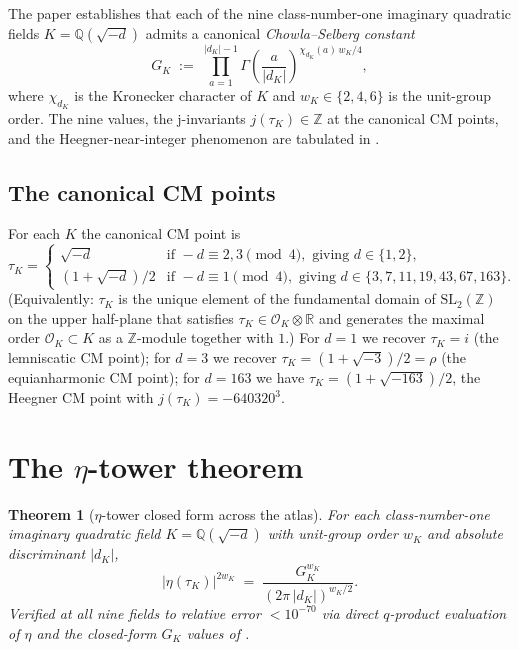 \documentclass[11pt]{amsart}
\theoremstyle{plain}
\newtheorem{theorem}{Theorem}[section]
\theoremstyle{definition}
\theoremstyle{remark}
\newcommand{\GK}{G_{K}}
\newcommand{\Z}{\mathbb{Z}}
\newcommand{\Q}{\mathbb{Q}}
\newcommand{\R}{\mathbb{R}}
\begin{document}
The paper \cite{paper-gstar-C} establishes that each of the nine
class-number-one imaginary quadratic fields $K = \Q(\sqrt{-d})$ admits a
canonical \emph{Chowla--Selberg constant}
\[
\GK \;:=\; \prod_{a=1}^{|d_K| - 1} \Gamma\!\left(\frac{a}{|d_K|}\right)^{\chi_{d_K}(a)\, w_K / 4},
\]
where $\chi_{d_K}$ is the Kronecker character of $K$ and $w_K \in \{2, 4, 6\}$
is the unit-group order. The nine values, the j-invariants $j(\tau_K) \in \Z$
at the canonical CM points, and the Heegner-near-integer phenomenon are
tabulated in \cite[Theorem 1.3]{paper-gstar-C}.

\subsection{The canonical CM points}

For each $K$ the canonical CM point is
\[
\tau_K =
\begin{cases}
\sqrt{-d} & \text{if } -d \equiv 2, 3 \pmod 4, \text{ giving } d \in \{1, 2\}, \\
(1 + \sqrt{-d})/2 & \text{if } -d \equiv 1 \pmod 4, \text{ giving } d \in \{3, 7, 11, 19, 43, 67, 163\}.
\end{cases}
\]
(Equivalently: $\tau_K$ is the unique element of the fundamental domain of
$\mathrm{SL}_{2}(\Z)$ on the upper half-plane that satisfies $\tau_K \in \mathcal{O}_K \otimes \R$
and generates the maximal order $\mathcal{O}_K \subset K$ as a $\Z$-module
together with $1$.) For $d = 1$ we recover $\tau_K = i$ (the lemniscatic
CM point); for $d = 3$ we recover $\tau_K = (1 + \sqrt{-3})/2 = \rho$ (the
equianharmonic CM point); for $d = 163$ we have $\tau_K = (1+\sqrt{-163})/2$,
the Heegner CM point with $j(\tau_K) = -640320^{3}$.

\section{The $\eta$-tower theorem}\label{sec:eta-tower}

\begin{theorem}[$\eta$-tower closed form across the atlas]\label{thm:eta-tower}
For each class-number-one imaginary quadratic field $K = \Q(\sqrt{-d})$ with
unit-group order $w_K$ and absolute discriminant $|d_K|$,
\begin{equation}\label{eq:eta-tower}
|\eta(\tau_K)|^{2 w_K} \;=\; \frac{\GK^{w_K}}{(2\pi\,|d_K|)^{w_K/2}}.
\end{equation}
Verified at all nine fields to relative error $< 10^{-70}$ via direct
$q$-product evaluation of $\eta$ and the closed-form $\GK$ values of
\cite[Theorem 1.3]{paper-gstar-C}.
\end{theorem}
\end{document}
